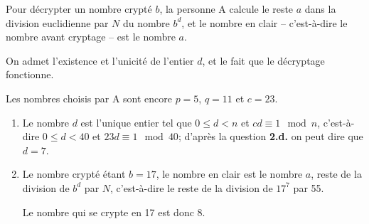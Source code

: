 \documentclass[10pt]{article}
\begin{document}
\begin{enumerate}
Pour décrypter un nombre crypté $b$, la personne A calcule le reste $a$ dans la division euclidienne par $N$ du nombre $b^d$, et le nombre en clair -- c'est-à-dire le nombre avant cryptage -- est le nombre $a$.

On admet l'existence et l'unicité de l'entier $d$, et le fait que le décryptage fonctionne.

Les nombres choisis par A sont encore $p = 5$, $q = 11$ et $c = 23$.
	\begin{enumerate}
		\item Le nombre $d$ est l'unique entier tel que $0 \leqslant d < n$ et $cd \equiv 1 \mod n$, c'est-à-dire  $0 \leqslant d < 40$ et $23d \equiv 1 \mod 40$; d'après la question \textbf{2.d.} on peut dire que $d=7$.
		\item Le nombre crypté étant $b = 17$,  le nombre en clair est le nombre $a$, reste de la division de $b^{d}$ par $N$, c'est-à-dire le reste de la division de $17^{7}$ par 55.


Le nombre qui se crypte en 17 est donc 8.
 
	\end{enumerate}
\end{enumerate}
\end{document}
